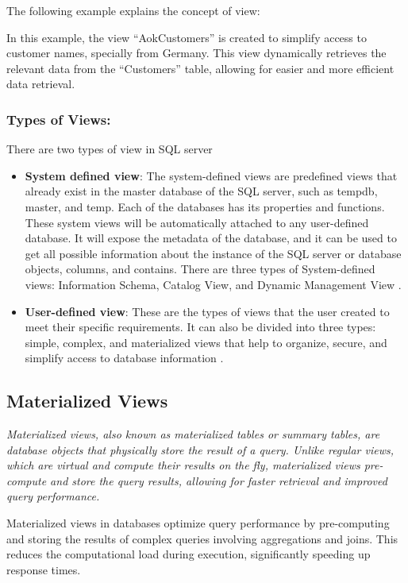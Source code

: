 The following example explains the concept of view:



 In this example, the view ``AokCustomers'' is created to simplify access to customer names, specially from Germany. This view dynamically retrieves the relevant data from the ``Customers'' table, allowing for easier and more efficient data retrieval.
 
\subsubsection{Types of Views:}

There are two types of view in SQL server
\begin{itemize}
    \item \textbf{System defined view}: The system-defined views are predefined views that already exist in the master database of the SQL server, such as tempdb, master, and temp. Each of the databases has its properties and functions. These system views will be automatically attached to any user-defined database. It will expose the metadata of the database, and it can be used to get all possible information about the instance of the SQL server or database objects, columns, and contains. There are three types of System-defined views: Information Schema, Catalog View, and Dynamic Management View \cite{chauhan-2024}.
    \item \textbf{User-defined view}: These are the types of views that the user created to meet their specific requirements. It can also be divided into three types: simple, complex, and materialized views that help to organize, secure, and simplify access to database information \cite{javapoint-author-2024}.
\end{itemize}
   
\subsection{Materialized Views}\label{term:materialized_views}
\noindent\textit{Materialized views, also known as materialized tables or summary tables, are database objects that physically store the result of a query. Unlike regular views, which are virtual and compute their results on the fly, materialized views pre-compute and store the query results, allowing for faster retrieval and improved query performance.} \vspace{.3cm}

Materialized views in databases optimize query performance by pre-computing and storing the results of complex queries involving aggregations and joins. This reduces the computational load during execution, significantly speeding up response times.\vspace{.4cm}

